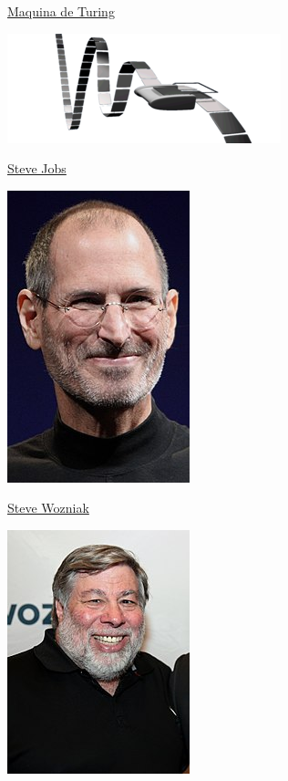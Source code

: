 \begin{center}
\vfill\null
\pagebreak	

\href{https://pt.wikipedia.org/wiki/M\%C3\%A1quina_de_Turing}{Maquina de Turing}

\includegraphics[height=.8\textheight]{./IMG-GIT/CIENTISTAS/300px-Turing_Machine.png}


\end{center}

\vfill\null
\pagebreak

\LARGE \href{https://pt.wikipedia.org/wiki/Steve_Jobs}{Steve Jobs}
	
		\begin{center}
		\includegraphics[height=.7\textheight]{./IMG-GIT/jobs.jpg}
	\end{center}

\vfill\null
\columnbreak

\href{https://pt.wikipedia.org/wiki/Steve_Wozniak}{Steve Wozniak}

	\begin{center}
		\includegraphics[height=.7\textheight]{./IMG-GIT/woz.jpg}
	\end{center}
	
